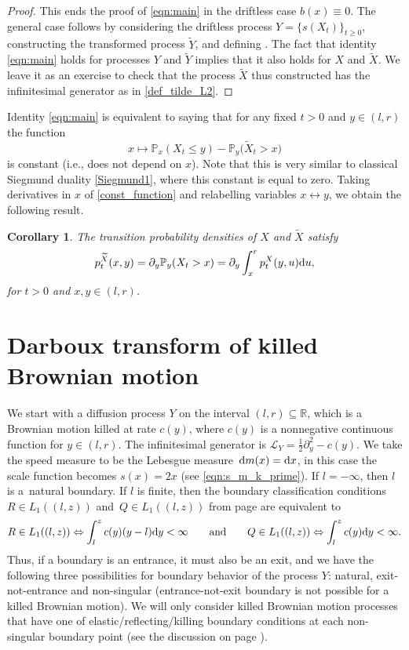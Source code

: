 \documentclass[10pt,a4paper]{amsart}
\numberwithin{equation}{section}
\newtheorem{Corollary}[Theorem]{Corollary}
\theoremstyle{definition}
\def\L{{\mathcal L}}
\def\p{{\mathbb P}}
\def\r{{\mathbb R}}
\def\d{{\textnormal d}}
\begin{document}
\begin{proof}
This ends the proof of \eqref{eqn:main} in the driftless case $b(x)\equiv 0$. The general case follows by considering the driftless process $Y=\{s(X_t)\}_{t\ge 0}$, constructing the transformed process $\widetilde Y$, and defining . The fact that
identity \eqref{eqn:main} holds for processes $Y$ and $\widetilde Y$ implies that it also holds for $X$ and $\widetilde X$. We leave it as an exercise to check that the process $\widetilde X$ thus constructed has the infinitesimal generator as in
\eqref{def_tilde_L2}.
\end{proof}

Identity \eqref{eqn:main} is equivalent to saying that for any fixed $t>0$ and $y \in (l,r)$ the function
\begin{equation}\label{const_function}
x\mapsto \p_x (X_t\le y) - \p_y\bigl(\widetilde X_t>x\bigr)
\end{equation}
is constant (i.e., does not depend on $x$). Note that this is very similar to classical Siegmund duality \eqref{Siegmund1}, where this constant is equal to zero. Taking derivatives in $x$ of \eqref{const_function} and relabelling variables $x\leftrightarrow y$, we obtain the following result.
\begin{Corollary}\label{corollary_main}
The transition probability densities of $X$ and $\widetilde X$ satisfy
\begin{equation}\label{eqn:main2}
p^{\widetilde X}_t(x,y)=\partial_y \p_y(X_t>x)=\partial_y \int_x^r p^X_t(y,u) \d u,
\end{equation}
for $t>0$ and $x,y\in (l,r)$.
\end{Corollary}


\section{Darboux transform of killed Brownian motion}\label{section_Darboux_diffusion}


We start with a diffusion process $Y$ on the interval $(l,r) \subseteq \r$, which is a Brownian motion killed at rate $c(y)$, where $c(y)$ is a nonnegative continuous function for $y\in (l,r)$. The infinitesimal generator is $\L_Y = \frac{1}{2} \partial_y^2 -c(y)$. We take the speed measure to be the Lebesgue measure~${\d m(x)=\d x}$, in this case the scale function becomes $s(x)=2x$ (see \eqref{eqn:s_m_k_prime}). If $l=-\infty$, then $l$ is a~natural boundary. If $l$ is finite, then the boundary classification conditions $R \in L_1((l,z))$ and~${Q \in L_1((l,z))}$ from page \pageref{R_Q_L1} are equivalent to
\[
R \in L_1((l,z)) \Leftrightarrow \int_l^z c(y) (y-l) \d y < \infty\qquad  \text{and}\qquad
Q \in L_1((l,z)) \Leftrightarrow \int_l^z c(y) \d y < \infty.
\]
Thus, if a boundary is an entrance, it must also be an exit, and we have the following three possibilities for boundary behavior of the process $Y$: natural, exit-not-entrance and non-singular (entrance-not-exit boundary is not possible for a killed Brownian motion). We will only consider killed Brownian motion processes that have one of elastic/reflecting/killing boundary conditions at each non-singular boundary point (see the discussion on page \pageref{elastic_boundary_condition}).
\end{document}
